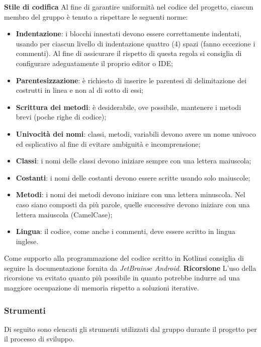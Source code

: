 			\textbf{Stile di codifica} \newline \newline
			Al fine di garantire uniformità nel codice del progetto, ciascun membro del gruppo è
			tenuto a rispettare le seguenti norme:
			\begin{itemize}
				\item \textbf{Indentazione}: i blocchi innestati devono essere correttamente indentati, usando per ciascun livello di indentazione quattro (4) spazi (fanno eccezione i commenti). Al fine di assicurare il rispetto di questa regola si consiglia di configurare adeguatamente il proprio editor o IDE;
				\item \textbf{Parentesizzazione}: è richiesto di inserire le parentesi di delimitazione dei costrutti in linea e non al di sotto di essi;
				\item \textbf{Scrittura dei metodi}: è desiderabile, ove possibile, mantenere i metodi brevi (poche righe di codice);
				\item \textbf{Univocità dei nomi}: classi, metodi, variabili devono avere un nome univoco	ed esplicativo al fine di evitare ambiguità e incomprensione;
				\item \textbf{Classi}: i nomi delle classi devono iniziare sempre con una lettera maiuscola;
				\item \textbf{Costanti}: i nomi delle costanti devono essere scritte usando solo maiuscole;
				\item \textbf{Metodi}: i nomi dei metodi devono iniziare con una lettera minuscola. Nel caso
				siano composti da più parole, quelle successive devono iniziare con una lettera maiuscola (CamelCase\glo{});
				\item \textbf{Lingua}: il codice, come anche i commenti, deve essere scritto in lingua inglese.
			\end{itemize}
			Come supporto alla programmazione del codice scritto in Kotlin\glosp si consiglia di seguire la documentazione fornita da \textit{JetBrains}\glosp e \textit{Android}\glo. \newline \newline
			\textbf{Ricorsione} \newline \newline
			L'uso della ricorsione va evitato quanto più possibile in  quanto  potrebbe
			indurre  ad  una  maggiore  occupazione  di  memoria  rispetto  a  soluzioni
			iterative.
	\subsubsection{Strumenti}
	Di seguito sono elencati gli strumenti utilizzati dal gruppo durante il progetto per il processo di sviluppo.	
